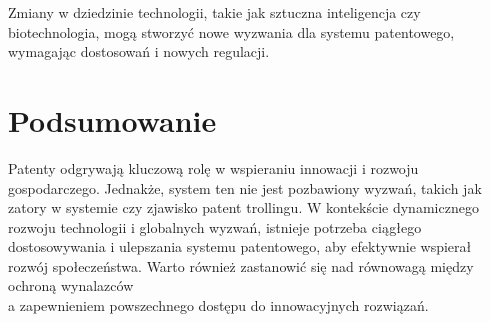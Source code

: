 \documentclass[12pt, letterpaper]{article}
\begin{document}
Zmiany w dziedzinie technologii, takie jak sztuczna inteligencja czy biotechnologia, mogą stworzyć nowe wyzwania dla systemu patentowego, wymagając dostosowań i nowych regulacji.

\section{Podsumowanie}

Patenty odgrywają kluczową rolę w wspieraniu innowacji i rozwoju gospodarczego. Jednakże, system ten nie jest pozbawiony wyzwań, takich jak zatory w systemie czy zjawisko patent trollingu. W kontekście dynamicznego rozwoju technologii i globalnych wyzwań, istnieje potrzeba ciągłego dostosowywania i ulepszania systemu patentowego, aby efektywnie wspierał rozwój społeczeństwa. Warto również zastanowić się nad równowagą między ochroną wynalazców \\ a zapewnieniem powszechnego dostępu do innowacyjnych rozwiązań.
\end{document}
